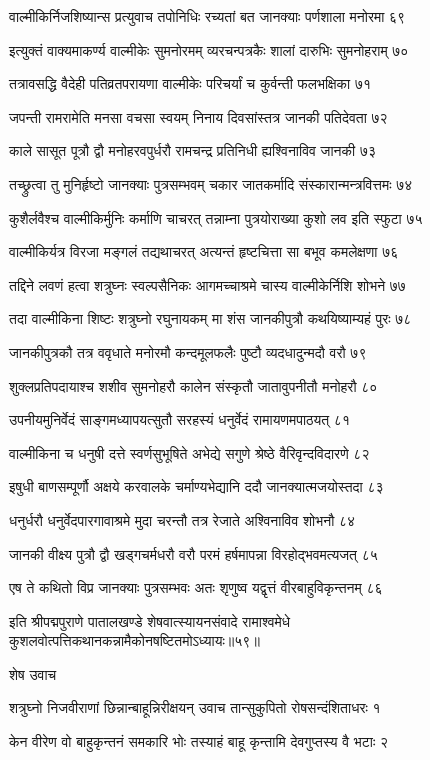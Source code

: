 वाल्मीकिर्निजशिष्यान्स प्रत्युवाच तपोनिधिः
रच्यतां बत जानक्याः पर्णशाला मनोरमा ६९

इत्युक्तं वाक्यमाकर्ण्य वाल्मीकेः सुमनोरमम्
व्यरचन्पत्रकैः शालां दारुभिः सुमनोहराम् ७०

तत्रावसद्धि वैदेही पतिव्रतपरायणा
वाल्मीकेः परिचर्यां च कुर्वन्ती फलभक्षिका ७१

जपन्ती रामरामेति मनसा वचसा स्वयम्
निनाय दिवसांस्तत्र जानकी पतिदेवता ७२

काले सासूत पूत्रौ द्वौ मनोहरवपुर्धरौ
रामचन्द्र प्रतिनिधी ह्यश्विनाविव जानकी ७३

तच्छ्रुत्वा तु मुनिर्हृष्टो जानक्याः पुत्रसम्भवम्
चकार जातकर्मादि संस्कारान्मन्त्रवित्तमः ७४

कुशैर्लवैश्च वाल्मीकिर्मुनिः कर्माणि चाचरत्
तन्नाम्ना पुत्रयोराख्या कुशो लव इति स्फुटा ७५

वाल्मीकिर्यत्र विरजा मङ्गलं तद्यथाचरत्
अत्यन्तं हृष्टचित्ता सा बभूव कमलेक्षणा ७६

तद्दिने लवणं हत्वा शत्रुघ्नः स्वल्पसैनिकः
आगमच्चाश्रमे चास्य वाल्मीकेर्निशि शोभने ७७

तदा वाल्मीकिना शिष्टः शत्रुघ्नो रघुनायकम्
मा शंस जानकीपुत्रौ कथयिष्याम्यहं पुरः ७८

जानकीपुत्रकौ तत्र ववृधाते मनोरमौ
कन्दमूलफलैः पुष्टौ व्यदधादुन्मदौ वरौ ७९

शुक्लप्रतिपदायाश्च शशीव सुमनोहरौ
कालेन संस्कृतौ जातावुपनीतौ मनोहरौ ८०

उपनीयमुनिर्वेदं साङ्गमध्यापयत्सुतौ
सरहस्यं धनुर्वेदं रामायणमपाठयत् ८१

वाल्मीकिना च धनुषी दत्ते स्वर्णसुभूषिते
अभेद्ये सगुणे श्रेष्ठे वैरिवृन्दविदारणे ८२

इषुधी बाणसम्पूर्णौ अक्षये करवालके
चर्माण्यभेद्यानि ददौ जानक्यात्मजयोस्तदा ८३

धनुर्धरौ धनुर्वेदपारगावाश्रमे मुदा
चरन्तौ तत्र रेजाते अश्विनाविव शोभनौ ८४

जानकी वीक्ष्य पुत्रौ द्वौ खड्गचर्मधरौ वरौ
परमं हर्षमापन्ना विरहोद्भवमत्यजत् ८५

एष ते कथितो विप्र जानक्याः पुत्रसम्भवः
अतः शृणुष्व यद्वृत्तं वीरबाहुविकृन्तनम् ८६

इति श्रीपद्मपुराणे पातालखण्डे शेषवात्स्यायनसंवादे रामाश्वमेधे कुशलवोत्पत्तिकथानकन्नामैकोनषष्टितमोऽध्यायः॥५९॥


शेष उवाच

शत्रुघ्नो निजवीराणां छिन्नान्बाहून्निरीक्षयन्
उवाच तान्सुकुपितो रोषसन्दंशिताधरः १

केन वीरेण वो बाहुकृन्तनं समकारि भोः
तस्याहं बाहू कृन्तामि देवगुप्तस्य वै भटाः २


